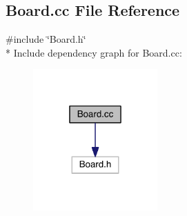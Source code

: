 \hypertarget{a00001}{}\subsection{Board.\+cc File Reference}
\label{a00001}
{\ttfamily \#include \char`\"{}Board.\+h\char`\"{}}\\*
Include dependency graph for Board.\+cc\+:
\nopagebreak
\begin{figure}[H]
\begin{center}
\leavevmode
\includegraphics[width=135pt]{a00011}
\end{center}
\end{figure}
